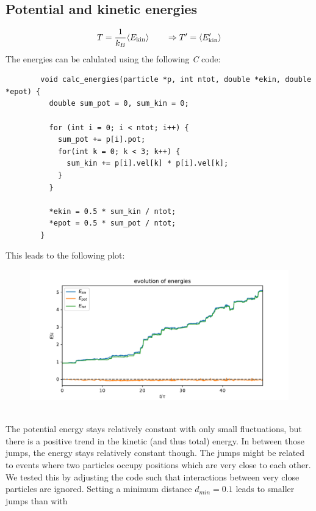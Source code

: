 \subsection{Potential and kinetic energies}
    \begin{equation}
        T=\frac{1}{k_B}\langle E_\textnormal{kin}\rangle \qquad
        \Rightarrow T'=\langle E_\textnormal{kin}'\rangle
    \end{equation}
    The energies can be calulated using the following \textit{C} code: \\
    \begin{lstlisting}
        void calc_energies(particle *p, int ntot, double *ekin, double *epot) {
          double sum_pot = 0, sum_kin = 0;
        
          for (int i = 0; i < ntot; i++) {
            sum_pot += p[i].pot;
            for(int k = 0; k < 3; k++) {
              sum_kin += p[i].vel[k] * p[i].vel[k];
            }
          }
        
          *ekin = 0.5 * sum_kin / ntot;
          *epot = 0.5 * sum_pot / ntot;
        }\end{lstlisting}
    This leads to the following plot:
    \begin{figure}[h!]
        \centering
        \includegraphics[width=\textwidth]{../figures/energy.pdf}
    \end{figure} \ \\ 
    The potential energy stays relatively constant with only small fluctuations,
    but there is a positive trend in the kinetic (and thus total) energy.
    In between those jumps, the energy stays relatively constant though.
    The jumps might be related to events where two particles occupy 
    positions which are very close to each other.
    We tested this by adjusting the code such that interactions
    between very close particles are ignored.
    Setting a minimum distance $d_{min}=0.1$ leads to smaller jumps than with 
